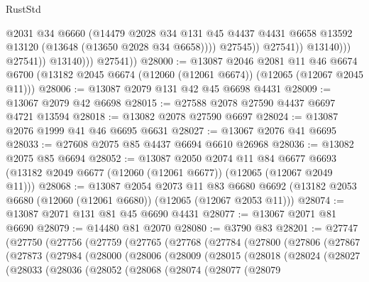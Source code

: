 \begin{lexlean}{RustStd}
\begin{coremodule}
                                  @2031
                                  @34
                                  @6660
                                  (@14479
                                    @2028
                                    @34
                                    @131
                                    @45
                                    @4437
                                    @4431
                                    @6658
                                    @13592
                                    @13120
                                    (@13648 (@13650 @2028 @34 @6658))))
                                @27545))
                            @27541))
                        @13140)))
                  @27541))
              @13140)))
        @27541))
@28000 := @13087
    @2046
    @2081
    @11
    @46
    @6674
    @6700
    (@13182 @2045 @6674 (@12060 (@12061 @6674)) (@12065 (@12067 @2045 @11)))
@28006 := @13087 @2079 @131 @42 @45 @6698 @4431
@28009 := @13067 @2079 @42 @6698
@28015 := @27588 @2078 @27590 @4437 @6697 @4721 @13594
@28018 := @13082 @2078 @27590 @6697
@28024 := @13087 @2076 @1999 @41 @46 @6695 @6631
@28027 := @13067 @2076 @41 @6695
@28033 := @27608 @2075 @85 @4437 @6694 @6610 @26968
@28036 := @13082 @2075 @85 @6694
@28052 := @13087
    @2050
    @2074
    @11
    @84
    @6677
    @6693
    (@13182 @2049 @6677 (@12060 (@12061 @6677)) (@12065 (@12067 @2049 @11)))
@28068 := @13087
    @2054
    @2073
    @11
    @83
    @6680
    @6692
    (@13182 @2053 @6680 (@12060 (@12061 @6680)) (@12065 (@12067 @2053 @11)))
@28074 := @13087 @2071 @131 @81 @45 @6690 @4431
@28077 := @13067 @2071 @81 @6690
@28079 := @14480 @81 @2070
@28080 := @3790 @83
@28201 := @27747
    (@27750
      (@27756
        (@27759
          (@27765
            (@27768
              (@27784
                (@27800
                  (@27806
                    (@27867
                      (@27873
                        (@27984
                          (@28000
                            (@28006
                              (@28009
                                (@28015
                                  (@28018
                                    (@28024
                                      (@28027
                                        (@28033
                                          (@28036
                                            (@28052
                                              (@28068
                                                (@28074
                                                  (@28077
                                                    (@28079

\end{coremodule}
\end{lexlean}

